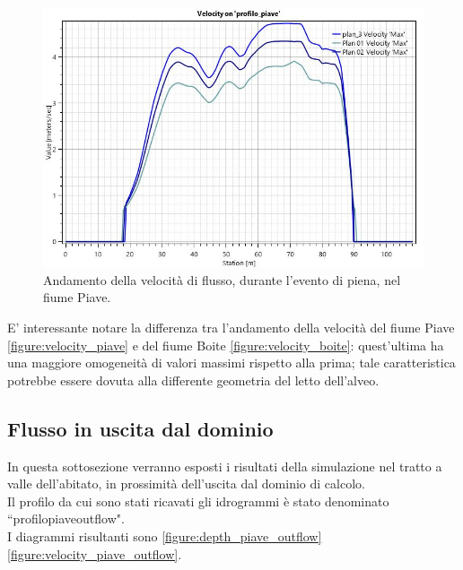 \begin{figure}[H] \centering
    \includegraphics[scale=0.5]{immagini/velocity_piave.JPG}
    \caption{Andamento della velocità di flusso, durante l'evento di piena, nel fiume Piave.}
    \label{figure:velocity_piave}
\end{figure}

E' interessante notare la differenza tra l'andamento della velocità del fiume Piave \eqref{figure:velocity_piave} e del fiume Boite \eqref{figure:velocity_boite}: quest'ultima ha una maggiore omogeneità di valori massimi rispetto alla prima; tale caratteristica potrebbe essere dovuta alla differente geometria del letto dell'alveo.

\subsection{Flusso in uscita dal dominio}
In questa sottosezione verranno esposti i risultati della simulazione nel tratto a valle dell'abitato, in prossimità dell'uscita dal dominio di calcolo.\\
Il profilo da cui sono stati ricavati gli idrogrammi è stato denominato  ``profilo\textunderscore piave\textunderscore outflow".\\
I diagrammi risultanti sono \eqref{figure:depth_piave_outflow}\eqref{figure:velocity_piave_outflow}.


